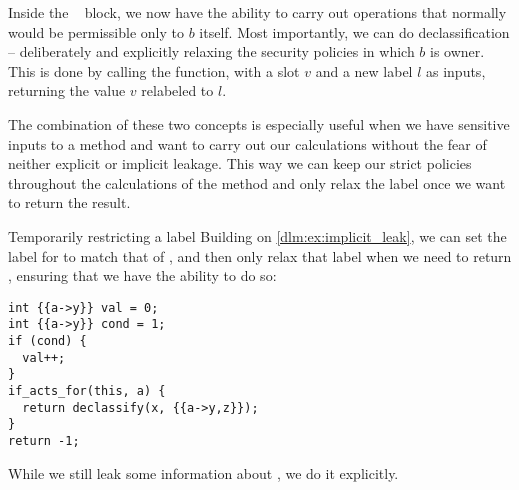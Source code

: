 Inside the \dlmactsfor~ block, we now have the ability to carry out operations that normally would be permissible only to $b$ itself.
Most importantly, we can do declassification -- deliberately and explicitly relaxing the security policies in which $b$ is owner.
This is done by calling the \dlmdeclassify{} function, with a slot $v$ and a new label $l$ as inputs, returning the value $v$ relabeled to $l$.

The combination of these two concepts is especially useful when we have sensitive inputs to a method and want to carry out our calculations without the fear of neither explicit or implicit leakage.
This way we can keep our strict policies throughout the calculations of the method and only relax the label once we want to return the result.

\begin{example}{Temporarily restricting a label}
  Building on \cref{dlm:ex:implicit_leak}, we can set the label for  to match that of , and then only relax that label when we need to return , ensuring that we have the ability to do so:
  \begin{lstlisting}[style=dlmc]
int {{a->y}} val = 0;
int {{a->y}} cond = 1;
if (cond) {
  val++;
}
if_acts_for(this, a) {
  return declassify(x, {{a->y,z}});
}
return -1;
  \end{lstlisting}
  While we still leak some information about , we do it explicitly.
\end{example}
